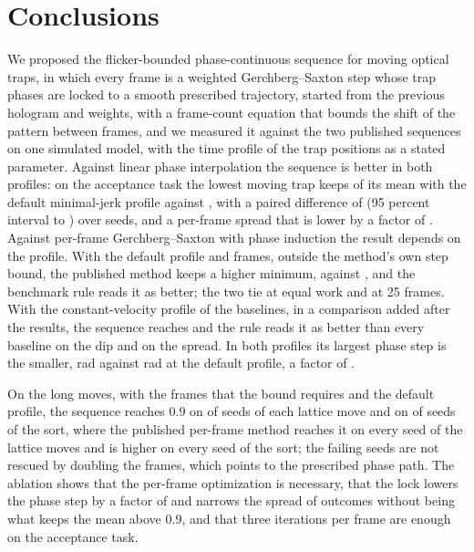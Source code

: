 \section{Conclusions}\label{sec:conclusions}

We proposed the flicker-bounded phase-continuous sequence for moving optical traps, in which every frame is a weighted Gerchberg--Saxton step whose trap phases are locked to a smooth prescribed trajectory, started from the previous hologram and weights, with a frame-count equation that bounds the shift of the pattern between frames, and we measured it against the two published sequences on one simulated model, with the time profile of the trap positions as a stated parameter. Against linear phase interpolation the sequence is better in both profiles: on the acceptance task the lowest moving trap keeps \accBTransMean{} of its mean with the default minimal-jerk profile against \accLpiTransMean{}, with a paired difference of \diffTwoMean{} (95 percent interval \diffTwoCiLo{} to \diffTwoCiHi{}) over \nSeedsTwo{} seeds, and a per-frame spread that is lower by a factor of . Against per-frame Gerchberg--Saxton with phase induction the result depends on the profile. With the default profile and \parFrames{} frames, outside the method's own step bound, the published method keeps a higher minimum, \accKimFiveTransMean{} against \accBTransMean{}, and the benchmark rule reads it as better; the two tie at equal work and at 25 frames. With the constant-velocity profile of the baselines, in a comparison added after the results, the sequence reaches \ablTLinearMean{} and the rule reads it as better than every baseline on the dip and on the spread. In both profiles its largest phase step is the smaller, \accBStepMax{} rad against \accKimFiveStepMax{} rad at the default profile, a factor of \stepRatio{}.

On the long moves, with the frames that the bound requires and the default profile, the sequence reaches $0.9$ on \longAMet{} of \longSeeds{} seeds of each lattice move and on \cTenMet{} of \cTenSeeds{} seeds of the sort, where the published per-frame method reaches it on every seed of the lattice moves and is higher on every seed of the sort; the failing seeds are not rescued by doubling the frames, which points to the prescribed phase path. The ablation shows that the per-frame optimization is necessary, that the lock lowers the phase step by a factor of \lockStepRatio{} and narrows the spread of outcomes without being what keeps the mean above $0.9$, and that three iterations per frame are enough on the acceptance task.

